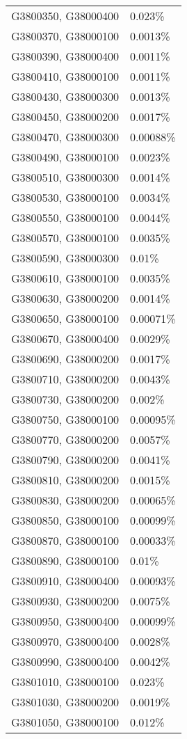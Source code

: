 \begin{longtable}[]{@{}ll@{}}
G3800350, G38000400 & 0.023\% \\
G3800370, G38000100 & 0.0013\% \\
G3800390, G38000400 & 0.0011\% \\
G3800410, G38000100 & 0.0011\% \\
G3800430, G38000300 & 0.0013\% \\
G3800450, G38000200 & 0.0017\% \\
G3800470, G38000300 & 0.00088\% \\
G3800490, G38000100 & 0.0023\% \\
G3800510, G38000300 & 0.0014\% \\
G3800530, G38000100 & 0.0034\% \\
G3800550, G38000100 & 0.0044\% \\
G3800570, G38000100 & 0.0035\% \\
G3800590, G38000300 & 0.01\% \\
G3800610, G38000100 & 0.0035\% \\
G3800630, G38000200 & 0.0014\% \\
G3800650, G38000100 & 0.00071\% \\
G3800670, G38000400 & 0.0029\% \\
G3800690, G38000200 & 0.0017\% \\
G3800710, G38000200 & 0.0043\% \\
G3800730, G38000200 & 0.002\% \\
G3800750, G38000100 & 0.00095\% \\
G3800770, G38000200 & 0.0057\% \\
G3800790, G38000200 & 0.0041\% \\
G3800810, G38000200 & 0.0015\% \\
G3800830, G38000200 & 0.00065\% \\
G3800850, G38000100 & 0.00099\% \\
G3800870, G38000100 & 0.00033\% \\
G3800890, G38000100 & 0.01\% \\
G3800910, G38000400 & 0.00093\% \\
G3800930, G38000200 & 0.0075\% \\
G3800950, G38000400 & 0.00099\% \\
G3800970, G38000400 & 0.0028\% \\
G3800990, G38000400 & 0.0042\% \\
G3801010, G38000100 & 0.023\% \\
G3801030, G38000200 & 0.0019\% \\
G3801050, G38000100 & 0.012\% \\

\end{longtable}
